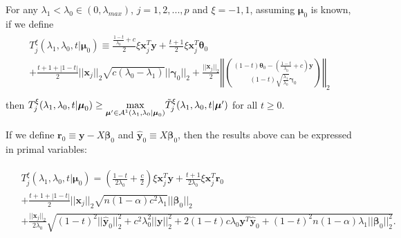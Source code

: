 \begin{theorem}
    \label{thm:2.1}
    For any $\lambda_1<\lambda_{0}\in (0,\lambda_{max})$, $j=1,2,...,p$ and $\xi=-1,1$, assuming $\boldsymbol\mu_0$ is known, if we define
    \begin{align}
        \begin{gathered}
            T^\xi_j(\lambda_1,\lambda_0,t|\boldsymbol\mu_0)\equiv\frac{\frac{1-t}{\lambda_0}+c}{2}\xi\boldsymbol x_j^T \boldsymbol y+\frac{t+1}{2}\xi \boldsymbol x_j^T \boldsymbol \theta_{0}\\+\frac{t+1+|1-t|}{2}||\boldsymbol x_j||_2\sqrt{c(\lambda_0-\lambda_1)}||\boldsymbol\gamma_{0}||_2+\frac{||\boldsymbol x_j||_2}{2}\left\Vert\binom{(1-t)\boldsymbol\theta_{0}-\left(\frac{1-t}{\lambda_0}+c\right)\boldsymbol y}{(1-t)\sqrt{\frac{\lambda_1}{\lambda_0}}\boldsymbol\gamma_{0}}\right\Vert_2\\
        \end{gathered}
    \end{align}
    then $T^\xi_j(\lambda_1,\lambda_0,t|\boldsymbol\mu_0)\geq\underset{\boldsymbol\mu'\in\mathcal{A}^1(\lambda_1,\lambda_0|\boldsymbol\mu_0)}{\mathrm{max}}\Tilde{T}^\xi_j(\lambda_1,\lambda_0,t|\boldsymbol\mu')$ for all $t\geq0$.
\end{theorem}

If we define $\boldsymbol r_0\equiv \boldsymbol y-X\boldsymbol\beta_{0}$ and $\hat{\boldsymbol y}_{0}\equiv X\boldsymbol\beta_{0}$, then the results above can be expressed in primal variables:

\begin{gather}
    \begin{aligned}
        &T^\xi_j(\lambda_1,\lambda_0,t|\boldsymbol\mu_0)=  \left(\frac{1-t}{2\lambda_0}+\frac{c}{2}\right)\xi\boldsymbol x_j^T \boldsymbol y+\frac{t+1}{2\lambda_0}\xi \boldsymbol x_j^T \boldsymbol r_{0}\\
        &+\frac{t+1+|1-t|}{2}||\boldsymbol x_j||_2\sqrt{n(1-\alpha) c^2\lambda_1}||\boldsymbol\beta_{0}||_2\\
        &+\frac{||\boldsymbol x_j||_2}{2\lambda_0}\sqrt{(1-t)^2||\hat{\boldsymbol y}_{0}||_2^2+c^2\lambda_0^2||\boldsymbol y||_2^2+2(1-t)c\lambda_0 \boldsymbol y^T\hat{\boldsymbol y}_{0}+(1-t)^2n(1-\alpha)\lambda_1||\boldsymbol\beta_{0}||_2^2}.
    \end{aligned}
\end{gather}

